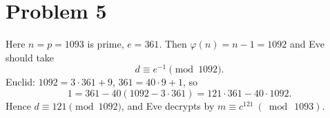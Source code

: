\section*{Problem 5}

Here $n=p=1093$ is prime, $e=361$. Then $\varphi(n)=n-1=1092$ and Eve should take
\[
d\equiv e^{-1}\pmod{1092}.
\]
Euclid: $1092=3\cdot 361+9$, $361=40\cdot 9+1$, so
\[
1=361-40(1092-3\cdot 361)=121\cdot 361-40\cdot 1092.
\]
Hence $d\equiv \boxed{121}\pmod{1092}$, and Eve decrypts by $m\equiv c^{121}\ (\bmod\ 1093)$.
